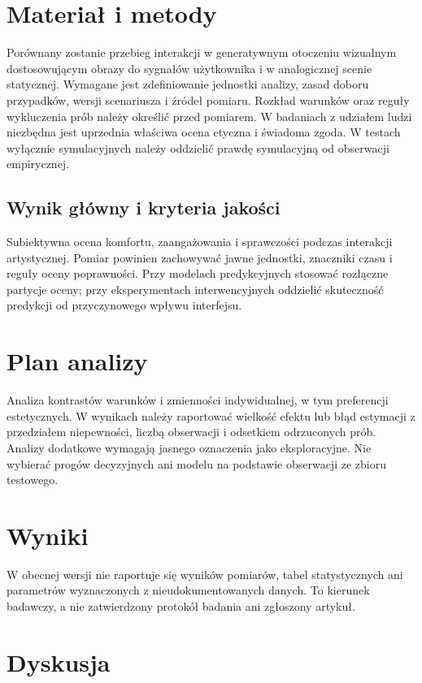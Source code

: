 \documentclass[11pt,a4paper]{article}
\begin{document}
\section{Materiał i metody}

Porównany zostanie przebieg interakcji w generatywnym otoczeniu wizualnym dostosowującym obrazy do sygnałów użytkownika i w analogicznej scenie statycznej. Wymagane jest zdefiniowanie jednostki analizy, zasad doboru przypadków, wersji scenariusza i źródeł pomiaru. Rozkład warunków oraz reguły wykluczenia prób należy określić przed pomiarem. W badaniach z udziałem ludzi niezbędna jest uprzednia właściwa ocena etyczna i świadoma zgoda. W testach wyłącznie symulacyjnych należy oddzielić prawdę symulacyjną od obserwacji empirycznej.

\subsection{Wynik główny i kryteria jakości}

Subiektywna ocena komfortu, zaangażowania i sprawczości podczas interakcji artystycznej. Pomiar powinien zachowywać jawne jednostki, znaczniki czasu i reguły oceny poprawności. Przy modelach predykcyjnych stosować rozłączne partycje oceny; przy eksperymentach interwencyjnych oddzielić skuteczność predykcji od przyczynowego wpływu interfejsu.

\section{Plan analizy}

Analiza kontrastów warunków i zmienności indywidualnej, w tym preferencji estetycznych. W wynikach należy raportować wielkość efektu lub błąd estymacji z przedziałem niepewności, liczbą obserwacji i odsetkiem odrzuconych prób. Analizy dodatkowe wymagają jasnego oznaczenia jako eksploracyjne. Nie wybierać progów decyzyjnych ani modelu na podstawie obserwacji ze zbioru testowego.

\section{Wyniki}

W obecnej wersji nie raportuje się wyników pomiarów, tabel statystycznych ani parametrów wyznaczonych z nieudokumentowanych danych. To kierunek badawczy, a nie zatwierdzony protokół badania ani zgłoszony artykuł.

\section{Dyskusja}
\end{document}
